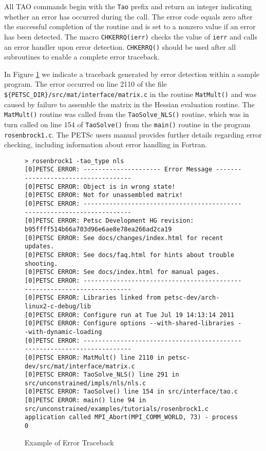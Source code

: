 All TAO commands begin with the \texttt{Tao} prefix and return an
integer indicating whether an error has occurred during the call.  The
error code equals zero after the successful completion of the routine
and is set to a nonzero value if an error has been detected.  The
macro \texttt{CHKERRQ(ierr)} checks the value of \texttt{ierr} and calls an
error handler upon error detection.  \texttt{CHKERRQ()} should be used after
all subroutines to enable a complete error traceback.

In Figure \ref{fig:traceback} we indicate a traceback generated by
error detection within a sample program. The error occurred on line
2110 of the file \texttt{\$\{PETSC\_DIR\}/src/mat/inter\-face/mat\-rix.c} in the
routine \texttt{MatMult()} and was caused by failure to assemble the 
matrix in the Hessian evaluation routine.
The \texttt{MatMult()} routine was called from
the \texttt{TaoSolve\_NLS()} routine, which was in turn called on line 
154 of \texttt{TaoSolve()} from the \texttt{main()} routine 
in the program \texttt{rosenbrock1.c}.  The PETSc users
manual \cite{petsc-user-ref} provides further details
regarding error checking, including
information about error handling in Fortran.

\begin{figure}[htb]
{\footnotesize
\begin{verbatim}
> rosenbrock1 -tao_type nls
[0]PETSC ERROR: --------------------- Error Message ------------------------------------
[0]PETSC ERROR: Object is in wrong state!
[0]PETSC ERROR: Not for unassembled matrix!
[0]PETSC ERROR: ------------------------------------------------------------------------
[0]PETSC ERROR: Petsc Development HG revision: b95ffff514b66a703d96e6ae8e78ea266ad2ca19
[0]PETSC ERROR: See docs/changes/index.html for recent updates.
[0]PETSC ERROR: See docs/faq.html for hints about trouble shooting.
[0]PETSC ERROR: See docs/index.html for manual pages.
[0]PETSC ERROR: ------------------------------------------------------------------------
[0]PETSC ERROR: Libraries linked from petsc-dev/arch-linux2-c-debug/lib
[0]PETSC ERROR: Configure run at Tue Jul 19 14:13:14 2011
[0]PETSC ERROR: Configure options --with-shared-libraries --with-dynamic-loading
[0]PETSC ERROR: ------------------------------------------------------------------------
[0]PETSC ERROR: MatMult() line 2110 in petsc-dev/src/mat/interface/matrix.c
[0]PETSC ERROR: TaoSolve_NLS() line 291 in src/unconstrained/impls/nls/nls.c
[0]PETSC ERROR: TaoSolve() line 154 in src/interface/tao.c
[0]PETSC ERROR: main() line 94 in src/unconstrained/examples/tutorials/rosenbrock1.c
application called MPI_Abort(MPI_COMM_WORLD, 73) - process 0
\end{verbatim}
}
\caption{Example of Error Traceback}
\label{fig:traceback}
\end{figure}

